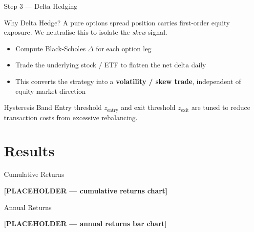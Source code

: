 \documentclass{beamer}
\begin{document}
\begin{frame}{Step 3 --- Delta Hedging}
  \begin{block}{Why Delta Hedge?}
    A pure options spread position carries first-order equity exposure.
    We neutralise this to isolate the \emph{skew} signal.
  \end{block}
  \vspace{0.5em}
  \begin{itemize}
    \item Compute Black-Scholes $\Delta$ for each option leg
    \item Trade the underlying stock / ETF to flatten the net delta daily
    \item This converts the strategy into a \textbf{volatility / skew trade},
          independent of equity market direction
  \end{itemize}
  \vspace{0.5em}
  \begin{exampleblock}{Hysteresis Band}
    Entry threshold $z_{\text{entry}}$ and exit threshold $z_{\text{exit}}$
    are tuned to reduce transaction costs from excessive rebalancing.
  \end{exampleblock}
\end{frame}

\section{Results}

\begin{frame}{Cumulative Returns}
  \begin{center}
    \vspace{2cm}
    \textbf{[PLACEHOLDER --- cumulative returns chart]}
    \vspace{2cm}
  \end{center}
\end{frame}

\begin{frame}{Annual Returns}
  \begin{center}
    \vspace{2cm}
    \textbf{[PLACEHOLDER --- annual returns bar chart]}
    \vspace{2cm}
  \end{center}
\end{frame}
\end{document}
